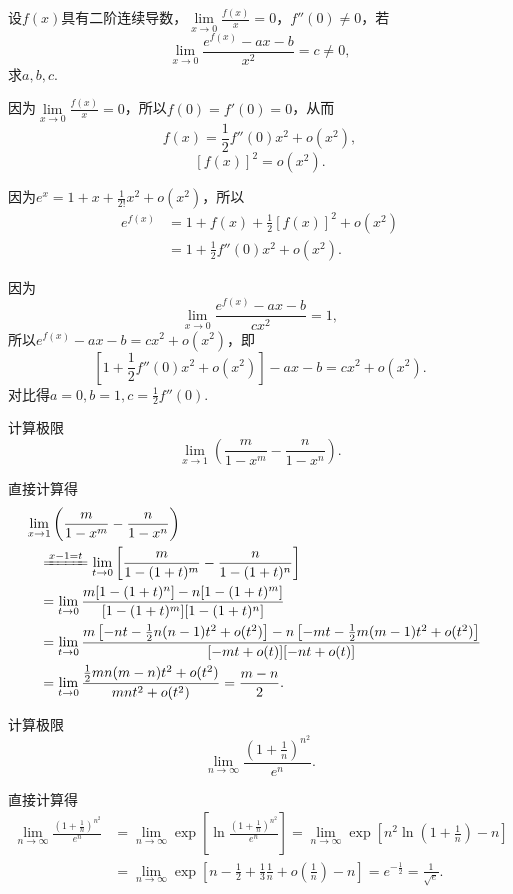 \begin{example}
\def\l{\lim\limits_{x\to0}}
设\(f(x)\)具有二阶连续导数，\(\l \frac{f(x)}{x} = 0\)，\(f''(0)\neq0\)，若\[
\l \frac{e^{f(x)}-ax-b}{x^2} = c \neq 0,
\]求\(a,b,c\).
\begin{solution}
因为\(\l \frac{f(x)}{x} = 0\)，所以\(f(0) = f'(0) = 0\)，从而\[
f(x) = \frac{1}{2} f''(0) x^2 + o(x^2),
\]\[
[f(x)]^2 = o(x^2).
\]

因为\(e^x = 1 + x + \frac{1}{2!} x^2 + o(x^2)\)，所以\begin{align*}
e^{f(x)} &= 1 + f(x) + \frac{1}{2} [f(x)]^2 + o(x^2) \\
&= 1 + \frac{1}{2} f''(0) x^2 + o(x^2).
\end{align*}

因为\[
\l \frac{e^{f(x)} - ax - b}{c x^2} = 1,
\]所以\(e^{f(x)} - ax - b = c x^2 + o(x^2)\)，即\[
\left[ 1 + \frac{1}{2} f''(0) x^2 + o(x^2) \right] - ax - b = c x^2 + o(x^2).
\]对比得\(a = 0, b = 1, c = \frac{1}{2} f''(0)\).
\end{solution}
\end{example}

\begin{example}
计算极限\[
\lim\limits_{x\to1} \left(\frac{m}{1-x^m} - \frac{n}{1-x^n}\right).
\]
\begin{solution}
直接计算得
\begin{align*}
&\hspace{-10pt}
\lim\limits_{x\to1} \left(\frac{m}{1-x^m} - \frac{n}{1-x^n}\right) \\
&\xlongequal{x-1=t}
\lim\limits_{t\to0} \left[\frac{m}{1-(1+t)^m}-\frac{n}{1-(1+t)^n}\right] \\
&=
\lim\limits_{t\to0} \frac{m[1-(1+t)^n]-n[1-(1+t)^m]}{[1-(1+t)^m][1-(1+t)^n]} \\
&=
\lim\limits_{t\to0} \frac{m\left[-nt-\frac{1}{2}n(n-1)t^2+o(t^2)\right]-n\left[-mt-\frac{1}{2}m(m-1)t^2+o(t^2)\right]}{[-mt+o(t)][-nt+o(t)]} \\
&=
\lim\limits_{t\to0} \frac{\frac{1}{2}mn(m-n)t^2+o(t^2)}{mnt^2+o(t^2)}
= \frac{m-n}{2}.
\end{align*}
\end{solution}
\end{example}

\begin{example}
\def\l{\lim\limits_{n\to\infty}}%
计算极限\[
\l \frac{\left(1+\frac{1}{n}\right)^{n^2}}{e^n}.
\]
\begin{solution}
直接计算得
\begin{align*}
\l \frac{\left(1+\frac{1}{n}\right)^{n^2}}{e^n} &= \l \exp[\ln\frac{\left(1+\frac{1}{n}\right)^{n^2}}{e^n}]
= \l \exp[ n^2 \ln(1+\frac{1}{n}) - n ] \\
&= \l \exp[ n - \frac{1}{2} + \frac{1}{3} \frac{1}{n} + o\left(\frac{1}{n}\right) - n ]
= e^{-\frac{1}{2}}
= \frac{1}{\sqrt{e}}.
\end{align*}
\end{solution}
\end{example}

